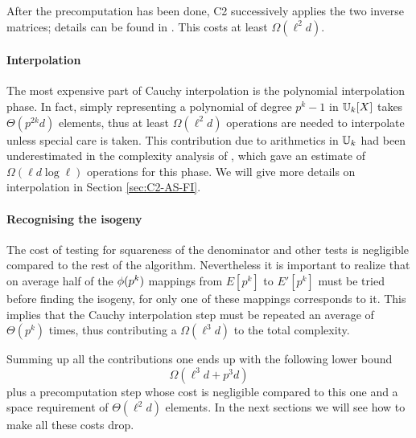 After the precomputation has been done, C2 successively applies the
two inverse matrices; details can be found in
\cite[$\S$2.4]{Cou96}. This costs at least $\Omega(\ell^2d)$.


\paragraph{Interpolation}
The most expensive part of Cauchy interpolation is the polynomial
interpolation phase. In fact, simply representing a polynomial of
degree $p^k-1$ in $\mathbb{U}_k[X]$ takes $\Theta(p^{2k}d)$ elements, thus at
least $\Omega(\ell^2d)$ operations are needed to interpolate unless
special care is taken. This contribution due to arithmetics in $\mathbb{U}_k$
had been underestimated in the complexity analysis of \cite{Cou96},
which gave an estimate of $\Omega(\ell d\log\ell)$ operations for this
phase. We will give more details on interpolation in Section
\ref{sec:C2-AS-FI}.


\paragraph{Recognising the isogeny}
The cost of testing for squareness of the denominator and other tests
is negligible compared to the rest of the algorithm. Nevertheless it
is important to realize that on average half of the $\phi(p^k)$
mappings from $E[p^k]$ to $E'[p^k]$ must be tried before finding the
isogeny, for only one of these mappings corresponds to it. This
implies that the Cauchy interpolation step must be repeated an average
of $\Theta(p^k)$ times, thus contributing a $\Omega(\ell^3d)$ to the
total complexity.

Summing up all the contributions one ends up with the following lower
bound
\begin{equation}
  \label{eq:C2:complexity}
  \Omega(\ell^3d + p^3d)
\end{equation}
plus a precomputation step whose cost is negligible compared to this
one and a space requirement of $\Theta(\ell^2d)$ elements. In the next
sections we will see how to make all these costs drop.




